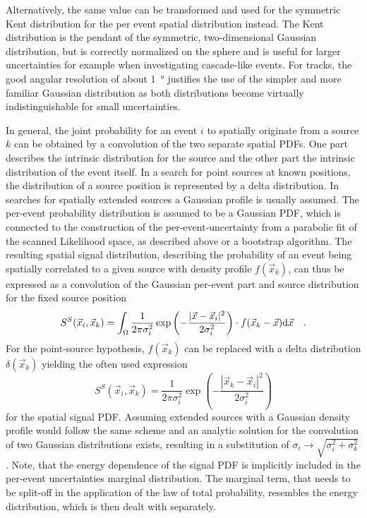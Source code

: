 Alternatively, the same value can be transformed and used for the symmetric Kent distribution \cite{Kent:1982pdf} for the per event spatial distribution instead.
The Kent distribution is the pendant of the symmetric, two-dimensional Gaussian distribution, but is correctly normalized on the sphere and is useful for larger uncertainties for example when investigating cascade-like events.
For tracks, the good angular resolution of about \SI{1}{\degree} justifies the use of the simpler and more familiar Gaussian distribution as both distributions become virtually indistinguishable for small uncertainties.

In general, the joint probability for an event $i$ to spatially originate from a source $k$ can be obtained by a convolution of the two separate spatial PDFs.
One part describes the intrinsic distribution for the source and the other part the intrinsic distribution of the event itself.
In a search for point sources at known positions, the distribution of a source position is represented by a delta distribution.
In searches for spatially extended sources a Gaussian profile is usually assumed.
The per-event probability distribution is assumed to be a Gaussian PDF, which is connected to the construction of the per-event-uncertainty from a parabolic fit of the scanned Likelihood space, as described above or a bootstrap algorithm.
The resulting spatial signal distribution, describing the probability of an event being spatially correlated to a given source with density profile $f(\vec{x}_k)$, can thus be expressed as a convolution of the Gaussian per-event part and source distribution for the fixed source position
\begin{equation}
  \label{equ:spatial_pdf}
  S^S(\vec{x}_i, \vec{x}_k)
  = \int_\Omega \frac{1}{2\pi \sigma_i^2}
    \exp\left(-\frac{|\vec{x}-\vec{x}_i|^2}{2\sigma_i^2}\right) \cdot
    f(\vec{x}_k - \vec{x}) \mathrm{d}\vec{x} \\
    \quad\text{.}
\end{equation}
For the point-source hypothesis, $f(\vec{x}_k)$ can be replaced with a delta distribution $\delta(\vec{x}_k)$ yielding the often used expression
\begin{equation}
  S^S(\vec{x}_i, \vec{x}_k)
  = \frac{1}{2\pi \sigma_i^2}
    \exp\left(-\frac{|\vec{x}_k-\vec{x}_i|^2}
                    {2\sigma_i^2}\right)
\end{equation}
for the spatial signal PDF.
Assuming extended sources with a Gaussian density profile would follow the same scheme and an analytic solution for the convolution of two Gaussian distributions exists, resulting in a substitution of $\sigma_i \rightarrow \sqrt{\sigma_i^2 + \sigma_k^2}$ \cite{Bromiley2014ProductsAC}.
Note, that the energy dependence of the signal PDF is implicitly included in the per-event uncertainties marginal distribution.
The marginal term, that needs to be split-off in the application of the law of total probability, resembles the energy distribution, which is then dealt with separately.

